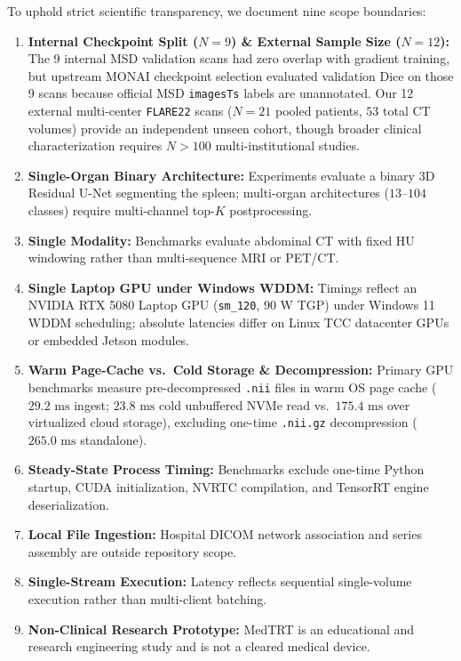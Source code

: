 \documentclass[10pt,twocolumn]{article}
\begin{document}
To uphold strict scientific transparency, we document nine scope boundaries:
\begin{enumerate}
    \item \textbf{Internal Checkpoint Split ($N=9$) \& External Sample Size ($N=12$):} The 9 internal MSD validation scans had zero overlap with gradient training, but upstream MONAI checkpoint selection evaluated validation Dice on those 9 scans because official MSD \texttt{imagesTs} labels are unannotated. Our 12 external multi-center \texttt{FLARE22} scans ($N=21$ pooled patients, $53$ total CT volumes) provide an independent unseen cohort, though broader clinical characterization requires $N > 100$ multi-institutional studies.
    \item \textbf{Single-Organ Binary Architecture:} Experiments evaluate a binary 3D Residual U-Net segmenting the spleen; multi-organ architectures ($13\text{--}104$ classes) require multi-channel top-$K$ postprocessing.
    \item \textbf{Single Modality:} Benchmarks evaluate abdominal CT with fixed HU windowing rather than multi-sequence MRI or PET/CT.
    \item \textbf{Single Laptop GPU under Windows WDDM:} Timings reflect an NVIDIA RTX 5080 Laptop GPU (\texttt{sm\_120}, $90\text{ W}$ TGP) under Windows 11 WDDM scheduling; absolute latencies differ on Linux TCC datacenter GPUs or embedded Jetson modules.
    \item \textbf{Warm Page-Cache vs.\ Cold Storage \& Decompression:} Primary GPU benchmarks measure pre-decompressed \texttt{.nii} files in warm OS page cache ($29.2\text{ ms}$ ingest; $23.8\text{ ms}$ cold unbuffered NVMe read vs.\ $175.4\text{ ms}$ over virtualized cloud storage), excluding one-time \texttt{.nii.gz} decompression ($265.0\text{ ms}$ standalone).
    \item \textbf{Steady-State Process Timing:} Benchmarks exclude one-time Python startup, CUDA initialization, NVRTC compilation, and TensorRT engine deserialization.
    \item \textbf{Local File Ingestion:} Hospital DICOM network association and series assembly are outside repository scope.
    \item \textbf{Single-Stream Execution:} Latency reflects sequential single-volume execution rather than multi-client batching.
    \item \textbf{Non-Clinical Research Prototype:} MedTRT is an educational and research engineering study and is not a cleared medical device.
\end{enumerate}
\end{document}
